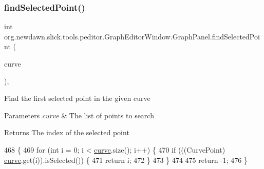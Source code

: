 \subsubsection{\texorpdfstring{find\+Selected\+Point()}{findSelectedPoint()}}
{\footnotesize\ttfamily int org.\+newdawn.\+slick.\+tools.\+peditor.\+Graph\+Editor\+Window.\+Graph\+Panel.\+find\+Selected\+Point (\begin{DoxyParamCaption}\item[{Array\+List}]{curve }\end{DoxyParamCaption})\hspace{0.3cm}{\ttfamily [inline]}, {\ttfamily [private]}}

Find the first selected point in the given curve


\begin{DoxyParams}{Parameters}
{\em curve} & The list of points to search \\
\hline
\end{DoxyParams}
\begin{DoxyReturn}{Returns}
The index of the selected point 
\end{DoxyReturn}

\begin{DoxyCode}
468                                                        \{
469             \textcolor{keywordflow}{for} (\textcolor{keywordtype}{int} i = 0; i < \mbox{\hyperlink{classorg_1_1newdawn_1_1slick_1_1tools_1_1peditor_1_1_graph_editor_window_1_1_graph_panel_ac95a7a77b5e8460041f157c02e19d2bb}{curve}}.size(); i++) \{
470                 \textcolor{keywordflow}{if} (((CurvePoint) \mbox{\hyperlink{classorg_1_1newdawn_1_1slick_1_1tools_1_1peditor_1_1_graph_editor_window_1_1_graph_panel_ac95a7a77b5e8460041f157c02e19d2bb}{curve}}.get(i)).isSelected()) \{
471                     \textcolor{keywordflow}{return} i;
472                 \}
473             \}
474 
475             \textcolor{keywordflow}{return} -1;
476         \}
\end{DoxyCode}
\mbox{\label{classorg_1_1newdawn_1_1slick_1_1tools_1_1peditor_1_1_graph_editor_window_1_1_graph_panel_a3017c8b8502a530904b07e1b8711a096}} 
